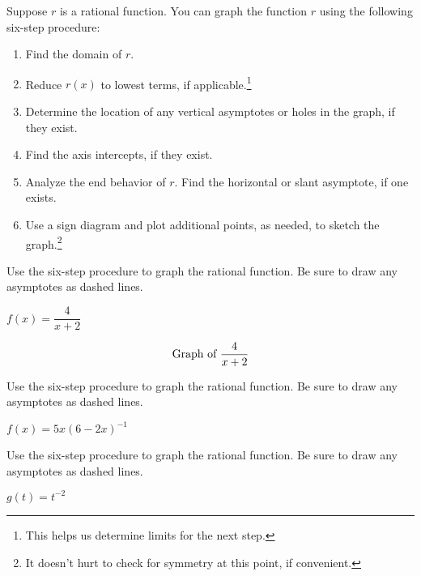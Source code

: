 \documentclass{ximera}
\begin{document}
	\author{Stitz-Zeager}


Suppose $r$ is a rational function.  You can graph the function $r$ using the following six-step procedure:

\begin{enumerate}

\item  Find the domain of $r$.

\item  Reduce $r(x)$ to lowest terms, if applicable.\footnote{This helps us determine limits for the next step.}

\item  Determine the location of any vertical asymptotes or holes in the graph, if they exist. 

\item  Find the axis intercepts, if they exist.

\item  Analyze the end behavior of $r$.  Find the horizontal or slant asymptote, if one exists.

\item  Use a sign diagram and plot additional points, as needed, to sketch the graph.\footnote{It doesn't hurt to check for symmetry at this point, if convenient.}

\end{enumerate}

\begin{problem}\label{sixstepfirst}
Use the six-step procedure
to graph the rational function.  Be sure to draw any asymptotes as dashed lines.

$f(x) = \dfrac{4}{x + 2}$

\begin{solution}
\[
\graph[xmin=-7, xmax=5, ymin=-5, ymax=5]{\frac{4}{x+2}}
\]
\end{solution}
\end{problem}

\begin{problem}
Use the six-step procedure
to graph the rational function.  Be sure to draw any asymptotes as dashed lines.

$f(x) = 5x(6-2x)^{-1}$ 
\end{problem}  

\begin{problem}
Use the six-step procedure
to graph the rational function.  Be sure to draw any asymptotes as dashed lines.

$g(t) = t^{-2}$
\end{problem} 
\end{document}
